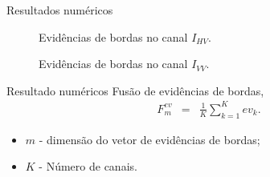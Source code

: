 \documentclass[10pt]{beamer}
\begin{document}
\begin{frame}{Resultados numéricos}
\begin{figure}[hbt]
\caption{Evidências de bordas no canal $I_{HV}$.}
\endminipage\hfill
{}
\caption{Evidências de bordas no canal $I_{VV}$.}
\endminipage\hfill
\end{figure}
\end{frame}
\begin{frame}{Resultado numéricos}
\alert{Fusão de evidências de bordas, \cite{mit}}
  \begin{equation}
\begin{array}{lll}
	F_{m}^{ev} &=&\frac{1}{K}\displaystyle{\sum_{k=1}^{K}ev_k}. 
\end{array}
\end{equation}
	\begin{itemize}
	\item $m$ - dimensão do vetor de evidências de bordas;
        \item $K$ - Número de canais.
	\end{itemize}
\end{frame}
\end{document}
